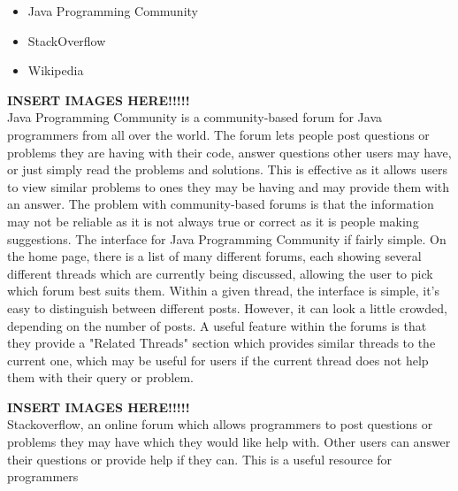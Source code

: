 \documentclass{article}
\begin{document}
\begin{itemize}
\item Java Programming Community
\item StackOverflow
\item Wikipedia
\end{itemize}

\textbf{INSERT IMAGES HERE!!!!!}\\

Java Programming Community is a community-based forum for Java programmers from all over the world. The forum lets people post questions or problems they are having with their code, answer questions other users may have, or just simply read the problems and solutions. This is effective as it allows users to view similar problems to ones they may be having and may provide them with an answer. The problem with community-based forums is that the information may not be reliable as it is not always true or correct as it is people making suggestions. The interface for Java Programming Community if fairly simple. On the home page, there is a list of many different forums, each showing several different threads which are currently being discussed, allowing the user to pick which forum best suits them. Within a given thread, the interface is simple, it's easy to distinguish between different posts. However, it can look a little crowded, depending on the number of posts. A useful feature within the forums is that they provide a "Related Threads" section which provides similar threads to the current one, which may be useful for users if the current thread does not help them with their query or problem.

\textbf{INSERT IMAGES HERE!!!!!}\\

Stackoverflow, an online forum which allows programmers to post questions or problems they may have which they would like help with. Other users can answer their questions or provide help if they can. This is a useful resource for programmers \\
\end{document}
